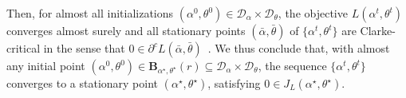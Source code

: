 Then, for almost all initializations $(\alpha^0,\theta^0) \in \mathcal{D}_\alpha \times \mathcal{D}_\theta$, the objective $L(\alpha^t,\theta^t)$ converges almost surely and all stationary points $(\bar{\alpha},\bar{\theta})$ of $\{\alpha^t,\theta^t\}$ are Clarke-critical in the sense that $0 \in \partial^c L(\bar{\alpha},\bar{\theta})$~\citep{path-diff}.
We thus conclude that, with almost any initial point $(\alpha^0,\theta^0) \in \mathbf{B}_{\alpha^\star,\theta^\star}(r) \subseteq  \mathcal{D}_\alpha \times \mathcal{D}_\theta$, the sequence $\{\alpha^t,\theta^t\}$ converges to a stationary point $(\alpha^\star,\theta^\star)$, satisfying $0 \in J_L(\alpha^{\star},\theta^{\star})$.
